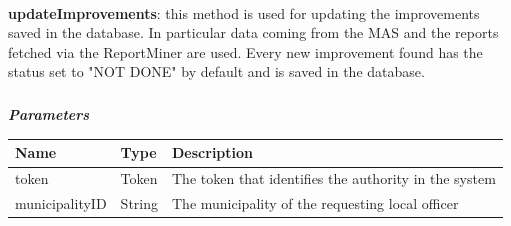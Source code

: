 					\paragraph{}
							\textbf{updateImprovements}: this method is used for updating the improvements saved in the database. In particular data coming from the MAS and the reports fetched via the ReportMiner are used. Every new improvement found has the status set to "NOT DONE" by default and is saved in the database.
							\clearpage
							\subparagraph{}
							\textit{\textbf{Parameters}}
							\vspace{-2mm}
								\begin{table}[!h]
									\begin{tabular}{L{0.2\textwidth}L{0.15\textwidth}L{0.45\textwidth}}
										\toprule
										\textbf{Name} & \textbf{Type} & \textbf{Description} \\
										\midrule
								  		token & Token & The token that identifies the authority in the system \\
								  		municipalityID & String & The municipality of the requesting local officer \\
								 		\bottomrule
									\end{tabular}
								\end{table}
							
